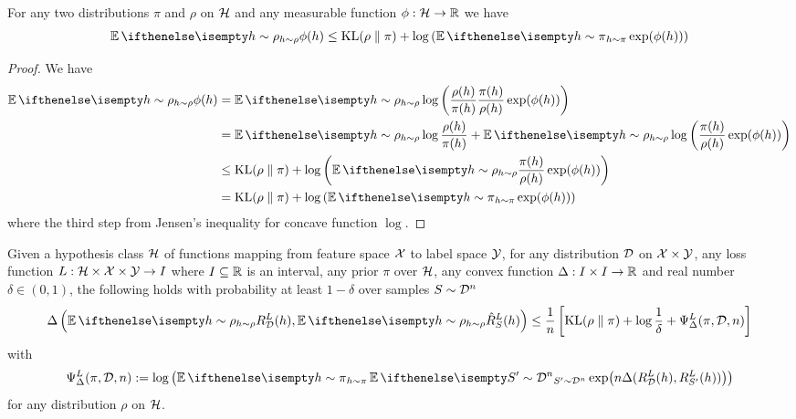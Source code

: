 \begin{lemma}
  For any two distributions $\pi$ and $\rho$ on $\mathcal{H}$ and any measurable
  function $\phi : \mathcal{H} \to \mathbb{R}$ we have
  \begin{equation}
    \Ev[h \sim \rho]{\phi(h)} \leq \KL{\rho}{\pi} + \log\left(\Ev[h \sim
    \pi]{\exp(\phi(h))}\right)
  \end{equation}
\end{lemma}

\begin{proof}
  We have
  \begin{equation}
    \begin{split}
      \Ev[h \sim \rho]{\phi(h)}
      &= \Ev[h \sim \rho]{\log\left(\frac{\rho(h)}{\pi(h)} \frac{\pi(h)}{\rho(h)}
      \exp(\phi(h))\right)} \\
      &= \Ev[h \sim \rho]{\log\frac{\rho(h)}{\pi(h)}} + \Ev[h \sim
      \rho]{\log\left(\frac{\pi(h)}{\rho(h)} \exp(\phi(h))\right)} \\
      &\leq \KL{\rho}{\pi} + \log\left(\Ev[h \sim \rho]{\frac{\pi(h)}{\rho(h)}
      \exp(\phi(h))}\right) \\
      &= \KL{\rho}{\pi} + \log\left(\Ev[h \sim \pi]{\exp(\phi(h))}\right)
    \end{split}
  \end{equation}
  where the third step from Jensen's inequality for concave function $\log$.
\end{proof}

\begin{theorem}
  \label{thm:pac-bayes}
  Given a hypothesis class $\mathcal{H}$ of functions mapping from feature space $\mathcal{X}$
  to label space $\mathcal{Y}$, for any distribution $\mathcal{D}$ on $\mathcal{X} \times \mathcal{Y}$, any loss
  function $L : \mathcal{H} \times \mathcal{X} \times \mathcal{Y} \to I$ where $I \subseteq \mathbb{R}$ is an
  interval, any prior $\pi$ over $\mathcal{H}$, any convex function $\Delta : I \times I
  \to \mathbb{R}$ and real number $\delta \in (0, 1)$, the following holds with
  probability at least $1 - \delta$ over samples $S \sim \mathcal{D}^n$
  \begin{equation}
    \label{eq:pac-bayes-bound}
    \Delta\left(\Ev[h \sim \rho]{R_\CD^L(h)}, \Ev[h \sim
    \rho]{\hat{R}_S^L(h)}\right) \leq \frac{1}{n} \left[\KL{\rho}{\pi} + \log
    \frac{1}{\delta} + \Psi_\Delta^L(\pi, \CD, n)\right]
  \end{equation}
  with
  \begin{equation}
    \Psi_\Delta^L(\pi, \CD, n) := \log\left(\Ev[h \sim \pi]{\Ev[S' \sim
    \CD^n]{\exp(n \Delta(R_\CD^L(h), R_{S'}^L(h)))}}\right)
  \end{equation}
  for any distribution $\rho$ on $\mathcal{H}$.
\end{theorem}

